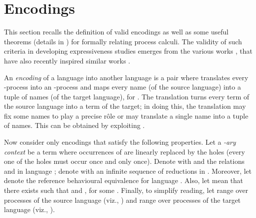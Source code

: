\documentclass[submission,copyright,creativecommons]{eptcs}
\begin{document}
\section{Encodings}
\label{sec:encoding}

This section recalls the definition of valid encodings as well as some
useful theorems (details in \cite{G:CONCUR08}) for formally relating process calculi.
The validity of such criteria in developing expressiveness studies emerges from the
various works \cite{G:IC08,G:DC10,G:CONCUR08}, that have also recently inspired similar works
\cite{LPSS10,Lanese:2010:EPP:2175486.2175506,gla12}. 

An {\em encoding} of a language  into another language  is a pair
 where  translates every -process into
an -process and  maps every name (of the source language) into a tuple
of  names (of the target language), for .
The translation  turns every term of the source language into a term of the
target; in doing this, the translation may fix some names to play a precise r\^ole 
or may translate a single name into a tuple of names. This can be obtained
by exploiting .

Now consider only encodings that satisfy the following properties.
Let a {\em -ary context}  be a term where 
occurrences of  are linearly replaced by the holes  (every one of the  holes must occur once and only once).
Denote with  and  
the relations  and  in language ;
denote with  an infinite sequence of reductions in .
Moreover, let  denote the reference behavioural equivalence for language .
Also, let  mean that there exists  such that  and ,
for some .
Finally, to simplify reading, let  range
over processes of the source language (viz., ) and  range
over processes of the target language (viz., ).
\end{document}
